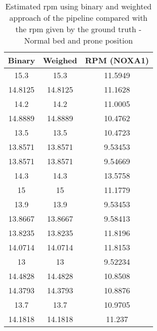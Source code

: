 \begin{table}[h]
    \centering
    \begin{tabular}{|c|c|c|}
 
    \hline 
    Binary & Weighed & RPM (NOXA1) \\  
\hline 
15.3     &    15.3  &    11.5949 \\ 
14.8125   &   14.8125  &   11.1628 \\ 
14.2      &   14.2  &    11.0005 \\ 
14.8889   &   14.8889  &    10.4762 \\ 
13.5      &   13.5  &    10.4723 \\ 
13.8571   &   13.8571   &   9.53453 \\ 
13.8571   &   13.8571  &   9.54669 \\ 
14.3    &     14.3   &   13.5758 \\ 
15      &     15   &   11.1779 \\ 
13.9     &    13.9  &    9.53453 \\ 
13.8667   &   13.8667   &   9.58413 \\ 
13.8235   &   13.8235    &  11.8196 \\ 
14.0714    &  14.0714    &  11.8153 \\ 
13        &   13   &   9.52234 \\ 
14.4828    &  14.4828   &   10.8508 \\ 
14.3793  &    14.3793  &    10.8876 \\ 
13.7     &    13.7  &    10.9705 \\ 
14.1818   &   14.1818   &    11.237 \\ 
\hline 
\end{tabular}
\caption{Estimated rpm using binary and weighted approach of the pipeline
compared with the rpm given by the ground truth
- Normal bed and prone position}
\label{tag:ProneNormalStillsg}

\end{table}